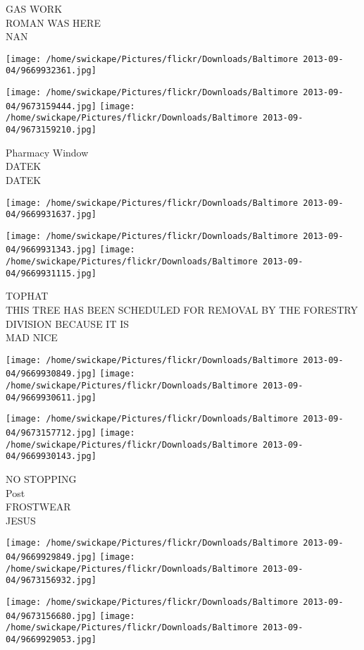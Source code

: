 \documentclass[10pt,letterpaper]{article}
\begin{document}
GAS WORK\\
ROMAN WAS HERE\\
NAN
\pagebreak

\texttt{[image: /home/swickape/Pictures/flickr/Downloads/Baltimore 2013-09-04/9669932361.jpg]}

\vspace{0.25in}
\texttt{[image: /home/swickape/Pictures/flickr/Downloads/Baltimore 2013-09-04/9673159444.jpg]}
\texttt{[image: /home/swickape/Pictures/flickr/Downloads/Baltimore 2013-09-04/9673159210.jpg]}

Pharmacy Window\\
DATEK\\
DATEK
\pagebreak

\texttt{[image: /home/swickape/Pictures/flickr/Downloads/Baltimore 2013-09-04/9669931637.jpg]}

\vspace{0.25in}
\texttt{[image: /home/swickape/Pictures/flickr/Downloads/Baltimore 2013-09-04/9669931343.jpg]}
\texttt{[image: /home/swickape/Pictures/flickr/Downloads/Baltimore 2013-09-04/9669931115.jpg]}

TOPHAT\\
THIS TREE HAS BEEN SCHEDULED FOR REMOVAL BY THE FORESTRY DIVISION BECAUSE IT IS\\
MAD NICE
\pagebreak

\texttt{[image: /home/swickape/Pictures/flickr/Downloads/Baltimore 2013-09-04/9669930849.jpg]}
\texttt{[image: /home/swickape/Pictures/flickr/Downloads/Baltimore 2013-09-04/9669930611.jpg]}

\texttt{[image: /home/swickape/Pictures/flickr/Downloads/Baltimore 2013-09-04/9673157712.jpg]}
\texttt{[image: /home/swickape/Pictures/flickr/Downloads/Baltimore 2013-09-04/9669930143.jpg]}

NO STOPPING\\
Post\\
FROSTWEAR\\
JESUS
\pagebreak

\texttt{[image: /home/swickape/Pictures/flickr/Downloads/Baltimore 2013-09-04/9669929849.jpg]}
\texttt{[image: /home/swickape/Pictures/flickr/Downloads/Baltimore 2013-09-04/9673156932.jpg]}

\texttt{[image: /home/swickape/Pictures/flickr/Downloads/Baltimore 2013-09-04/9673156680.jpg]}
\texttt{[image: /home/swickape/Pictures/flickr/Downloads/Baltimore 2013-09-04/9669929053.jpg]}
\end{document}
